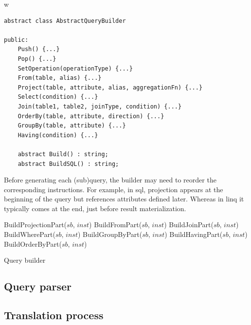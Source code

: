 w
 \begin{lstlisting}[caption={AbstractQueryBuilder class structure}, language=pseudo, label={lst:aqb}]
abstract class AbstractQueryBuilder
    
public: 
    Push() {...}
    Pop() {...}
    SetOperation(operationType) {...}
    From(table, alias) {...}
    Project(table, attribute, alias, aggregationFn) {...}
    Select(condition) {...}
    Join(table1, table2, joinType, condition) {...}
    OrderBy(table, attribute, direction) {...}
    GroupBy(table, attribute) {...}
    Having(condition) {...}
    
    abstract Build() : string;
    abstract BuildSQL() : string;
 \end{lstlisting}

 Before generating each (sub)query, the builder may need to reorder the corresponding instructions. For example, in \acrshort{sql}, projection appears at the beginning of the query but references attributes defined later. Whereas in \acrshort{linq} it typically comes at the end, just before result materialization.


 
\begin{algorithm}[!htp]
    \small
    \DontPrintSemicolon

    
    
    BuildProjectionPart($sb$, $inst$)\;
    BuildFromPart($sb$, $inst$)\;
    BuildJoinPart($sb$, $inst$)\;
    BuildWherePart($sb$, $inst$)\;
    BuildGroupByPart($sb$, $inst$)\;
    BuildHavingPart($sb$, $inst$)\;
    BuildOrderByPart($sb$, $inst$)\;

    \caption{Query builder}
    \label{alg:query_builder_main}
\end{algorithm}
 

\subsection{Query parser}


\subsection{Translation process}


